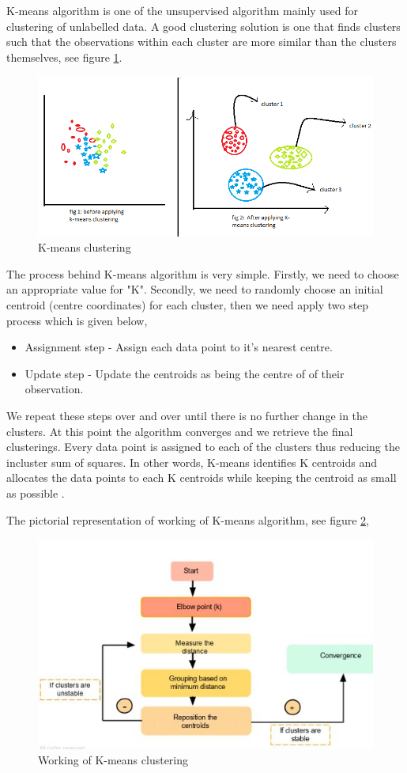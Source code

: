 \documentclass[format=sigconf]{acmart}
\begin{document}
K-means algorithm is one of the unsupervised algorithm mainly used for clustering of unlabelled data. A good clustering solution 
is one that finds clusters such that the observations within each cluster are more similar than the clusters themselves, see figure
\ref{fig:kmeans}.
\begin{figure}[H]
    \centering
    \includegraphics[scale=0.45]{kmeans.png}
    \caption{K-means clustering}
    \label{fig:kmeans}
\end{figure}
The process behind K-means algorithm is very simple. Firstly, we need to choose an appropriate value for "K". Secondly, we need to 
randomly choose an initial centroid (centre coordinates) for each cluster, then we need apply two step process which is given below,
\begin{itemize}
    \item Assignment step - Assign each data point to it's nearest centre.
    \item Update step - Update the centroids as being the centre of of their observation.
\end{itemize}
We repeat these steps over and over until there is no further change in the clusters. At this point the algorithm converges and 
we retrieve the final clusterings. Every data point is assigned to each of the clusters thus reducing the incluster sum of squares.
In other words, K-means identifies K centroids and allocates the data points to each K centroids while keeping the centroid as small
as possible \cite{kmeans}. 

The pictorial representation of working of K-means algorithm, see figure \ref{fig:kmeansworking},
\begin{figure}[H]
    \centering
    \includegraphics[scale=0.55]{kmeans_1.jpeg}
    \caption{Working of K-means clustering}
    \label{fig:kmeansworking}
\end{figure}
\end{document}
